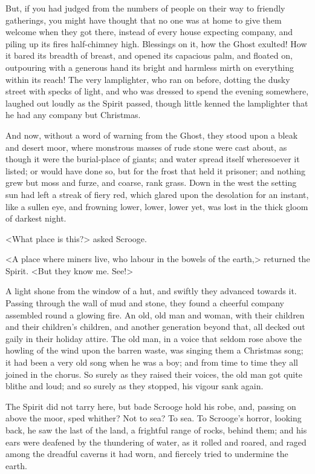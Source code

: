 But, if you had judged from the numbers of people on their way to friendly gatherings, you might have thought that no one was at home to give them welcome when they got there, instead of every house expecting company, and piling up its fires half-chimney high. Blessings on it, how the Ghost exulted! How it bared its breadth of breast, and opened its capacious palm, and floated on, outpouring with a generous hand its bright and harmless mirth on everything within its reach! The very lamplighter, who ran on before, dotting the dusky street with specks of light, and who was dressed to spend the evening somewhere, laughed out loudly as the Spirit passed, though little kenned the lamplighter that he had any company but Christmas.

And now, without a word of warning from the Ghost, they stood upon a bleak and desert moor, where monstrous masses of rude stone were cast about, as though it were the burial-place of giants; and water spread itself wheresoever it listed; or would have done so, but for the frost that held it prisoner; and nothing grew but moss and furze, and coarse, rank grass. Down in the west the setting sun had left a streak of fiery red, which glared upon the desolation for an instant, like a sullen eye, and frowning lower, lower, lower yet, was lost in the thick gloom of darkest night.

<What place is this?> asked Scrooge.

<A place where miners live, who labour in the bowels of the earth,> returned the Spirit. <But they know me. See!>

A light shone from the window of a hut, and swiftly they advanced towards it. Passing through the wall of mud and stone, they found a cheerful company assembled round a glowing fire. An old, old man and woman, with their children and their children's children, and another generation beyond that, all decked out gaily in their holiday attire. The old man, in a voice that seldom rose above the howling of the wind upon the barren waste, was singing them a Christmas song; it had been a very old song when he was a boy; and from time to time they all joined in the chorus. So surely as they raised their voices, the old man got quite blithe and loud; and so surely as they stopped, his vigour sank again.

The Spirit did not tarry here, but bade Scrooge hold his robe, and, passing on above the moor, sped whither? Not to sea? To sea. To Scrooge's horror, looking back, he saw the last of the land, a frightful range of rocks, behind them; and his ears were deafened by the thundering of water, as it rolled and roared, and raged among the dreadful caverns it had worn, and fiercely tried to undermine the earth.

